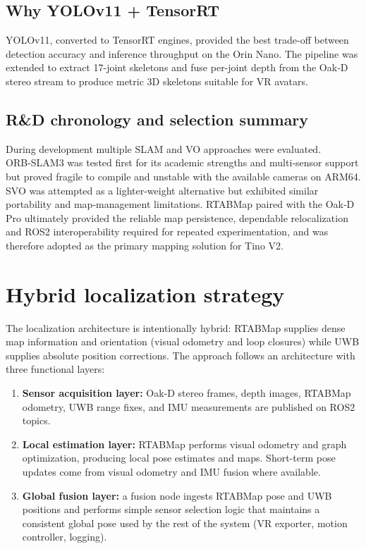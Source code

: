 \subsection*{Why YOLOv11 + TensorRT}
YOLOv11, converted to TensorRT engines, provided the best trade-off between detection accuracy and inference throughput on the Orin Nano. The pipeline was extended to extract 17-joint skeletons and fuse per-joint depth from the Oak‑D stereo stream to produce metric 3D skeletons suitable for VR avatars.

\subsection*{R\&D chronology and selection summary}
During development multiple SLAM and VO approaches were evaluated. ORB‑SLAM3 was tested first for its academic strengths and multi‑sensor support but proved fragile to compile and unstable with the available cameras on ARM64. SVO was attempted as a lighter‑weight alternative but exhibited similar portability and map‑management limitations. RTABMap paired with the Oak‑D Pro ultimately provided the reliable map persistence, dependable relocalization and ROS2 interoperability required for repeated experimentation, and was therefore adopted as the primary mapping solution for Tino V2.

\section{Hybrid localization strategy}

The localization architecture is intentionally hybrid: RTABMap supplies dense map information and orientation (visual odometry and loop closures) while UWB supplies absolute position corrections. The approach follows an architecture with three functional layers:

\begin{enumerate}
	\item \textbf{Sensor acquisition layer:} Oak‑D stereo frames, depth images, RTABMap odometry, UWB range fixes, and IMU measurements are published on ROS2 topics.
	\item \textbf{Local estimation layer:} RTABMap performs visual odometry and graph optimization, producing local pose estimates and maps. Short-term pose updates come from visual odometry and IMU fusion where available.
	\item \textbf{Global fusion layer:} a fusion node ingests RTABMap pose and UWB positions and performs simple sensor selection logic that maintains a consistent global pose used by the rest of the system (VR exporter, motion controller, logging).
\end{enumerate}

